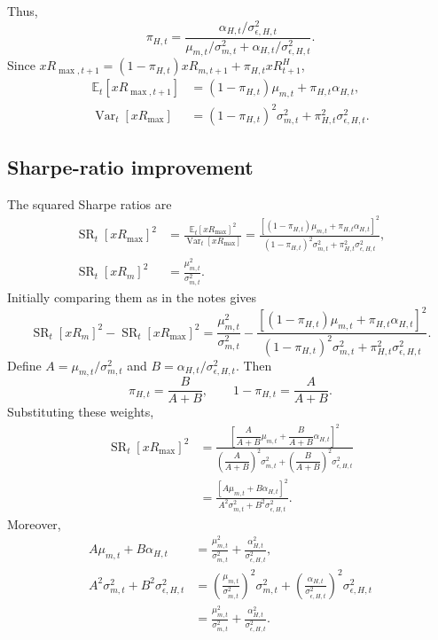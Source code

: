 \documentclass[11pt]{article}
\newcommand{\Et}{\mathbb{E}_t}
\newcommand{\Vt}{\operatorname{Var}_t}
\begin{document}
Thus,
\[
\pi_{H,t}=\frac{\alpha_{H,t}/\sigma^2_{\epsilon,H,t}}
{\mu_{m,t}/\sigma^2_{m,t}+\alpha_{H,t}/\sigma^2_{\epsilon,H,t}}.
\]
Since $xR_{\max,t+1}=(1-\pi_{H,t})xR_{m,t+1}+\pi_{H,t}xR^H_{t+1}$,
\begin{align*}
\Et[xR_{\max,t+1}]&=(1-\pi_{H,t})\mu_{m,t}+\pi_{H,t}\alpha_{H,t},\\
\Vt[xR_{\max}]&=(1-\pi_{H,t})^2\sigma^2_{m,t}
+\pi_{H,t}^2\sigma^2_{\epsilon,H,t}.
\end{align*}
\clearpage
\subsection*{Sharpe-ratio improvement}
The squared Sharpe ratios are
\begin{align*}
\operatorname{SR}_t[xR_{\max}]^2
&=\frac{\Et[xR_{\max}]^2}{\Vt[xR_{\max}]}
=\frac{[(1-\pi_{H,t})\mu_{m,t}+\pi_{H,t}\alpha_{H,t}]^2}
{(1-\pi_{H,t})^2\sigma^2_{m,t}+\pi_{H,t}^2\sigma^2_{\epsilon,H,t}},\\
\operatorname{SR}_t[xR_m]^2&=\frac{\mu_{m,t}^2}{\sigma^2_{m,t}}.
\end{align*}
Initially comparing them as in the notes gives
\[
\operatorname{SR}_t[xR_m]^2-\operatorname{SR}_t[xR_{\max}]^2
=\frac{\mu_{m,t}^2}{\sigma^2_{m,t}}
-\frac{[(1-\pi_{H,t})\mu_{m,t}+\pi_{H,t}\alpha_{H,t}]^2}
{(1-\pi_{H,t})^2\sigma^2_{m,t}+\pi_{H,t}^2\sigma^2_{\epsilon,H,t}}.
\]
Define $A=\mu_{m,t}/\sigma^2_{m,t}$ and
$B=\alpha_{H,t}/\sigma^2_{\epsilon,H,t}$. Then
\[
\pi_{H,t}=\frac{B}{A+B},\qquad 1-\pi_{H,t}=\frac{A}{A+B}.
\]
Substituting these weights,
\begin{align*}
\operatorname{SR}_t[xR_{\max}]^2
&=\frac{\left[\dfrac{A}{A+B}\mu_{m,t}
+\dfrac{B}{A+B}\alpha_{H,t}\right]^2}
{\left(\dfrac{A}{A+B}\right)^2\sigma^2_{m,t}
+\left(\dfrac{B}{A+B}\right)^2\sigma^2_{\epsilon,H,t}}\\
&=\frac{[A\mu_{m,t}+B\alpha_{H,t}]^2}
{A^2\sigma^2_{m,t}+B^2\sigma^2_{\epsilon,H,t}}.
\end{align*}
Moreover,
\begin{align*}
A\mu_{m,t}+B\alpha_{H,t}
&=\frac{\mu_{m,t}^2}{\sigma^2_{m,t}}
+\frac{\alpha_{H,t}^2}{\sigma^2_{\epsilon,H,t}},\\
A^2\sigma^2_{m,t}+B^2\sigma^2_{\epsilon,H,t}
&=\left(\frac{\mu_{m,t}}{\sigma^2_{m,t}}\right)^2\sigma^2_{m,t}
+\left(\frac{\alpha_{H,t}}{\sigma^2_{\epsilon,H,t}}\right)^2\sigma^2_{\epsilon,H,t}\\
&=\frac{\mu_{m,t}^2}{\sigma^2_{m,t}}
+\frac{\alpha_{H,t}^2}{\sigma^2_{\epsilon,H,t}}.
\end{align*}
\end{document}
